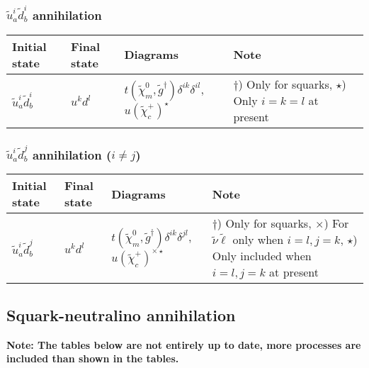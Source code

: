 \subsubsection{$\tilde{u}_a^i \tilde{d}_{b}^{i}$ annihilation}

\begin{center}
\begin{tabular}{llll} \hline
{\bfseries Initial state} & {\bfseries Final state} &
{\bfseries Diagrams} & {\bfseries Note} \\ \hline \tabspace
$\tilde{u}^i_a \tilde{d}^{i}_b$ & $u^k d^l$ &
$t(\tilde{\chi}_m^0,\tilde{g}^\dagger)\delta^{ik}\delta^{il}$, $u(\tilde{\chi}_c^+)^\star$ 
& \parbox[t]{4cm}{$\dagger$) Only for squarks, $\star$) Only $i=k=l$ at present} \\ \hline
\end{tabular}
\end{center}

\subsubsection{$\tilde{u}_a^i \tilde{d}_{b}^{j}$ annihilation ($i \ne j$)}

\begin{center}
\begin{tabular}{llll} \hline
{\bfseries Initial state} & {\bfseries Final state} &
{\bfseries Diagrams} & {\bfseries Note} \\ \hline \tabspace
$\tilde{u}^i_a \tilde{d}^{j}_b$ & $u^k d^l$ &
$t(\tilde{\chi}_m^0,\tilde{g}^\dagger)\delta^{ik}\delta^{jl}$, $u(\tilde{\chi}_c^+)^{\times\star}$ 
& \parbox[t]{4cm}{$\dagger$) Only for squarks, $\times$) For $\tilde{\nu}\tilde{\ell}$ only when $i=l,j=k$,
$\star$) Only included when $i=l,j=k$ at present} \\ \hline
\end{tabular}
\end{center}


\subsection{Squark-neutralino annihilation}

{\bfseries Note: The tables below are not entirely up to date, more processes are included
than shown in the tables.}

